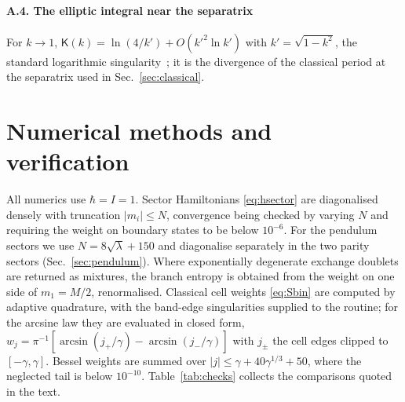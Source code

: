 \documentclass[preprint,12pt]{elsarticle}
\begin{document}
\paragraph{A.4. The elliptic integral near the separatrix} For
$k\to1$, $\mathsf{K}(k)=\ln(4/k')+O(k'^{2}\ln k')$ with $k'=\sqrt{1-k^{2}}$, the
standard logarithmic singularity~\cite{AbramowitzStegun}; it is the divergence of
the classical period at the separatrix used in Sec.~\ref{sec:classical}.

\section{Numerical methods and verification}
\label{app:num}

All numerics use $\hbar=I=1$. Sector Hamiltonians \eqref{eq:hsector} are
diagonalised densely with truncation $|m_{i}|\le N$, convergence being checked
by varying $N$ and requiring the weight on boundary states to be below
$10^{-6}$. For the pendulum sectors we use $N=8\sqrt{\lambda}+150$ and
diagonalise separately in the two parity sectors (Sec.~\ref{sec:pendulum}).
Where exponentially degenerate exchange doublets are returned as mixtures, the
branch entropy is obtained from the weight on one side of $m_{1}=M/2$,
renormalised. Classical cell weights \eqref{eq:Sbin} are computed by adaptive
quadrature, with the band-edge singularities supplied to the routine; for the
arcsine law they are evaluated in closed form,
$w_{j}=\pi^{-1}[\arcsin(j_{+}/\gamma)-\arcsin(j_{-}/\gamma)]$ with $j_{\pm}$ the
cell edges clipped to $[-\gamma,\gamma]$. Bessel weights are summed over
$|j|\le\gamma+40\gamma^{1/3}+50$, where the neglected tail is below
$10^{-10}$. Table~\ref{tab:checks} collects the comparisons quoted in the text.
\end{document}
